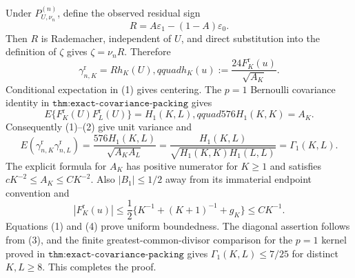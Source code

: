 Under \(P_{U,\nu_n}^{(n)}\), define the observed residual sign
\[
 R=A\varepsilon_1-(1-A)\varepsilon_0.
\]
Then \(R\) is Rademacher, independent of \(U\), and direct substitution into the definition of \(\zeta\) gives \(\zeta=\nu_nR\).  Therefore
\[
 \gamma_{n,K}^{\mathrm r}=R h_K(U),qquad
 h_K(u):=\frac{24F_K^{\mathrm r}(u)}{\sqrt{A_K}}.                         \tag{1}
\]
Conditional expectation in (1) gives centering.  The \(p=1\) Bernoulli covariance identity in \(\texttt{thm:exact-covariance-packing}\) gives
\[
 E\{F_K^{\mathrm r}(U)F_L^{\mathrm r}(U)\}=H_1(K,L),qquad
 576H_1(K,K)=A_K.                                                           \tag{2}
\]
Consequently (1)--(2) give unit variance and
\[
 E(\gamma_{n,K}^{\mathrm r}\gamma_{n,L}^{\mathrm r})
 =\frac{576H_1(K,L)}{\sqrt{A_KA_L}}
 =\frac{H_1(K,L)}{\sqrt{H_1(K,K)H_1(L,L)}}=\Gamma_1(K,L).                \tag{3}
\]
The explicit formula for \(A_K\) has positive numerator for \(K\geq1\) and satisfies \(cK^{-2}\leq A_K\leq CK^{-2}\).  Also \(|B_1|\leq1/2\) away from its immaterial endpoint convention and
\[
 |F_K^{\mathrm r}(u)|
 \leq\frac12\{K^{-1}+(K+1)^{-1}+g_K\}\leq CK^{-1}.                      \tag{4}
\]
Equations (1) and (4) prove uniform boundedness.  The diagonal assertion follows from (3), and the finite greatest-common-divisor comparison for the \(p=1\) kernel proved in \(\texttt{thm:exact-covariance-packing}\) gives \(\Gamma_1(K,L)\leq7/25\) for distinct \(K,L\geq8\).  This completes the proof.